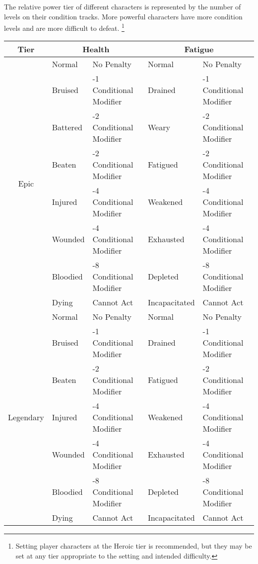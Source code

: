 \documentclass[11pt]{article}
\begin{document}
The relative power tier of different characters is represented by the number of levels on their condition tracks.
More powerful characters have more condition levels and are more difficult to defeat.
\footnote{Setting player characters at the Heroic tier is recommended, but they may be set at any tier appropriate to the setting and intended difficulty.}

\begin{center}
	\begin{tabular}{|c|ll|ll|}
		\multicolumn{1}{c}{Tier} & \multicolumn{2}{c}{Health} & \multicolumn{2}{c}{Fatigue}\\
		\hline
		\multirow{8}{*}{Epic}
		 & Normal   & No Penalty              & Normal        & No Penalty              \\
		 & Bruised  & -1 Conditional Modifier & Drained       & -1 Conditional Modifier \\
		 & Battered & -2 Conditional Modifier & Weary         & -2 Conditional Modifier \\
		 & Beaten   & -2 Conditional Modifier & Fatigued      & -2 Conditional Modifier \\
		 & Injured  & -4 Conditional Modifier & Weakened      & -4 Conditional Modifier \\
		 & Wounded  & -4 Conditional Modifier & Exhausted     & -4 Conditional Modifier \\
		 & Bloodied & -8 Conditional Modifier & Depleted      & -8 Conditional Modifier \\
		 & Dying    & Cannot Act              & Incapacitated & Cannot Act              \\
		\hline
		\multirow{7}{*}{Legendary}
		 & Normal   & No Penalty              & Normal        & No Penalty              \\
		 & Bruised  & -1 Conditional Modifier & Drained       & -1 Conditional Modifier \\
		 & Beaten   & -2 Conditional Modifier & Fatigued      & -2 Conditional Modifier \\
		 & Injured  & -4 Conditional Modifier & Weakened      & -4 Conditional Modifier      \\
		 & Wounded  & -4 Conditional Modifier & Exhausted     & -4 Conditional Modifier \\
		 & Bloodied & -8 Conditional Modifier & Depleted      & -8 Conditional Modifier \\
		 & Dying    & Cannot Act              & Incapacitated & Cannot Act              \\
		\hline

\end{tabular}
\end{center}
\end{document}
